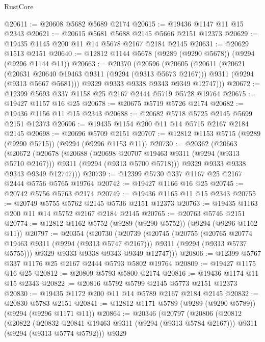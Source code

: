 \begin{lexlean}{RustCore}
\begin{coremodule}
@20611 := @20608 @5682 @5689 @2174
@20615 := @19436 @1147 @11 @15 @2343
@20621 := @20615 @5681 @5688 @2145 @5666 @2151 @12373
@20629 := @19435 @1145 @200 @11 @14 @5678 @2167 @2184 @2145
@20631 := @20629 @1513 @2151
@20640 := @12812 @1144 @5678 (@9289 (@9290 @5678)) (@9294 (@9296 @1144 @11))
@20663 := @20370
    (@20596
      (@20605
        (@20611
          (@20621
            (@20631 @20640 @19463 @9311 (@9294 (@9313 @5673 @2167)))
            @9311
            (@9294 (@9313 @5667 @5681)))
          @9329
          @9333
          @9338
          @9343
          @9349
          @12747)))
@20672 := @12399 @5693 @337 @1158 @25 @2167 @2444 @5719 @5728 @19764
@20675 := @19427 @1157 @16 @25
@20678 := @20675 @5719 @5726 @2174
@20682 := @19436 @1156 @11 @15 @2343
@20688 := @20682 @5718 @5725 @2145 @5699 @2151 @12373
@20696 := @19435 @1154 @200 @11 @14 @5715 @2167 @2184 @2145
@20698 := @20696 @5709 @2151
@20707 := @12812 @1153 @5715 (@9289 (@9290 @5715)) (@9294 (@9296 @1153 @11))
@20730 := @20362
    (@20663
      (@20672
        (@20678
          (@20688
            (@20698 @20707 @19463 @9311 (@9294 (@9313 @5710 @2167)))
            @9311
            (@9294 (@9313 @5700 @5718)))
          @9329
          @9333
          @9338
          @9343
          @9349
          @12747)))
@20739 := @12399 @5730 @337 @1167 @25 @2167 @2444 @5756 @5765 @19764
@20742 := @19427 @1166 @16 @25
@20745 := @20742 @5756 @5763 @2174
@20749 := @19436 @1165 @11 @15 @2343
@20755 := @20749 @5755 @5762 @2145 @5736 @2151 @12373
@20763 := @19435 @1163 @200 @11 @14 @5752 @2167 @2184 @2145
@20765 := @20763 @5746 @2151
@20774 := @12812 @1162 @5752 (@9289 (@9290 @5752)) (@9294 (@9296 @1162 @11))
@20797 := @20354
    (@20730
      (@20739
        (@20745
          (@20755
            (@20765 @20774 @19463 @9311 (@9294 (@9313 @5747 @2167)))
            @9311
            (@9294 (@9313 @5737 @5755)))
          @9329
          @9333
          @9338
          @9343
          @9349
          @12747)))
@20806 := @12399 @5767 @337 @1176 @25 @2167 @2444 @5793 @5802 @19764
@20809 := @19427 @1175 @16 @25
@20812 := @20809 @5793 @5800 @2174
@20816 := @19436 @1174 @11 @15 @2343
@20822 := @20816 @5792 @5799 @2145 @5773 @2151 @12373
@20830 := @19435 @1172 @200 @11 @14 @5789 @2167 @2184 @2145
@20832 := @20830 @5783 @2151
@20841 := @12812 @1171 @5789 (@9289 (@9290 @5789)) (@9294 (@9296 @1171 @11))
@20864 := @20346
    (@20797
      (@20806
        (@20812
          (@20822
            (@20832 @20841 @19463 @9311 (@9294 (@9313 @5784 @2167)))
            @9311
            (@9294 (@9313 @5774 @5792)))
          @9329

\end{coremodule}
\end{lexlean}
